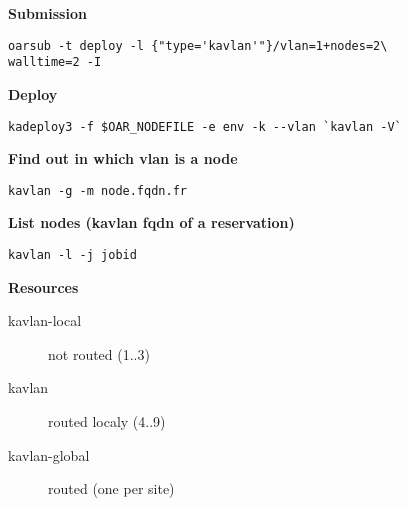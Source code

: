 \textbf{Submission}
\begin{lstlisting}
oarsub -t deploy -l {"type='kavlan'"}/vlan=1+nodes=2\
walltime=2 -I
\end{lstlisting}

\textbf{Deploy}
\begin{lstlisting}
kadeploy3 -f $OAR_NODEFILE -e env -k --vlan `kavlan -V`
\end{lstlisting}

\textbf{Find out in which vlan is a node}
\begin{lstlisting}
kavlan -g -m node.fqdn.fr
\end{lstlisting}

\textbf{List nodes (kavlan fqdn of a reservation)}
\begin{lstlisting}
kavlan -l -j jobid
\end{lstlisting}

\textbf{Resources}
\begin{description}
\item[kavlan-local] not routed (1..3)
\item[kavlan] routed localy (4..9)
\item[kavlan-global] routed (one per site)
\end{description}\vspace{-1.5em}%